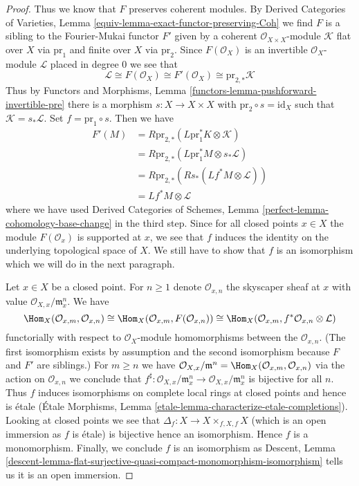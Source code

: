 \begin{proof}
\medskip\noindent
Thus we know that $F$ preserves coherent modules. By
Derived Categories of Varieties, Lemma
\ref{equiv-lemma-exact-functor-preserving-Coh}
we find $F$ is a sibling to the Fourier-Mukai functor $F'$ given by
a coherent $\mathcal{O}_{X \times X}$-module $\mathcal{K}$
flat over $X$ via $\text{pr}_1$ and finite over $X$ via $\text{pr}_2$.
Since $F(\mathcal{O}_X)$ is an invertible $\mathcal{O}_X$-module
$\mathcal{L}$ placed in degree $0$ we see that
$$
\mathcal{L} \cong F(\mathcal{O}_X) \cong F'(\mathcal{O}_X) \cong
\text{pr}_{2, *}\mathcal{K}
$$
Thus by
Functors and Morphisms, Lemma \ref{functors-lemma-pushforward-invertible-pre}
there
is a morphism $s : X \to X \times X$ with $\text{pr}_2 \circ s = \text{id}_X$
such that $\mathcal{K} = s_*\mathcal{L}$. Set $f = \text{pr}_1 \circ s$.
Then we have
\begin{align*}
F'(M)
& =
R\text{pr}_{2, *}(L\text{pr}_1^*K \otimes \mathcal{K}) \\
& =
R\text{pr}_{2, *}(L\text{pr}_1^*M \otimes s_*\mathcal{L}) \\
& =
R\text{pr}_{2, *}(Rs_*(Lf^*M \otimes \mathcal{L})) \\
& =
Lf^*M \otimes \mathcal{L}
\end{align*}
where we have used
Derived Categories of Schemes, Lemma \ref{perfect-lemma-cohomology-base-change}
in the third step.
Since for all closed points $x \in X$ the module $F(\mathcal{O}_x)$
is supported at $x$, we see that $f$ induces the identity on the
underlying topological space of $X$. We still have to show that
$f$ is an isomorphism which we will do in the next paragraph.

\medskip\noindent
Let $x \in X$ be a closed point.
For $n \geq 1$ denote $\mathcal{O}_{x, n}$ the skyscaper
sheaf at $x$ with value $\mathcal{O}_{X, x}/\mathfrak m_x^n$.
We have
$$
\Hom_X(\mathcal{O}_{x, m}, \mathcal{O}_{x, n}) \cong
\Hom_X(\mathcal{O}_{x, m}, F(\mathcal{O}_{x, n})) \cong
\Hom_X(\mathcal{O}_{x, m}, f^*\mathcal{O}_{x, n} \otimes \mathcal{L})
$$
functorially with respect to $\mathcal{O}_X$-module homomorphisms
between the $\mathcal{O}_{x, n}$. (The first isomorphism exists
by assumption and the second isomorphism because $F$ and $F'$ are siblings.)
For $m \geq n$ we have $\mathcal{O}_{X, x}/\mathfrak m^n =
\Hom_X(\mathcal{O}_{x, m}, \mathcal{O}_{x, n})$
via the action on $\mathcal{O}_{x, n}$
we conclude that $f^\sharp : \mathcal{O}_{X, x}/\mathfrak m_x^n \to
\mathcal{O}_{X, x}/\mathfrak m_x^n$ is bijective for all $n$.
Thus $f$ induces isomorphisms on complete local rings at closed
points and hence is \'etale
(\'Etale Morphisms, Lemma \ref{etale-lemma-characterize-etale-completions}).
Looking at closed points we see that
$\Delta_f : X \to X \times_{f, X, f} X$ (which is an open immersion
as $f$ is \'etale) is bijective hence an isomorphism.
Hence $f$ is a monomorphism. Finally, we conclude $f$ is an isomorphism
as Descent, Lemma
\ref{descent-lemma-flat-surjective-quasi-compact-monomorphism-isomorphism}
tells us it is an open immersion.
\end{proof}










